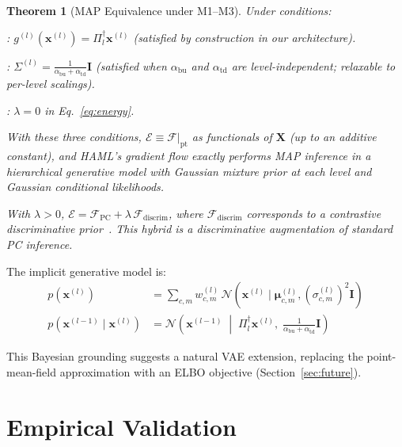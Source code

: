 \documentclass[11pt,a4paper]{article}
\newtheorem{theorem}{Theorem}[section]
\begin{document}
\begin{theorem}[MAP Equivalence under M1--M3]
\label{thm:map}
Under conditions:
\begin{description}[leftmargin=2.5em]
  \item[M1 -- Linear generators]: $g^{(l)}(\mathbf{x}^{(l)}) = \Pi_l^\dagger \mathbf{x}^{(l)}$
        (satisfied by construction in our architecture).
  \item[M2 -- Isotropic covariances]: $\Sigma^{(l)} = \frac{1}{\alpha_{\mathrm{bu}}+\alpha_{\mathrm{td}}}\mathbf{I}$
        (satisfied when $\alpha_{\mathrm{bu}}$ and $\alpha_{\mathrm{td}}$ are level-independent;
        relaxable to per-level scalings).
  \item[M3 -- No repulsion]: $\lambda = 0$ in Eq.~\ref{eq:energy}.
\end{description}
With these three conditions, $\mathcal{E} \equiv \mathcal{F}|_{\mathrm{pt}}$ as functionals
of $\mathbf{X}$ (up to an additive constant), and HAML's gradient flow exactly performs
\emph{MAP inference} in a hierarchical generative model with Gaussian mixture prior at
each level and Gaussian conditional likelihoods.

With $\lambda > 0$, $\mathcal{E} = \mathcal{F}_{\mathrm{PC}} + \lambda\,\mathcal{F}_{\mathrm{discrim}}$,
where $\mathcal{F}_{\mathrm{discrim}}$ corresponds to a contrastive discriminative
prior~\cite{larochelle2008}. This hybrid is a discriminative augmentation of standard PC
inference.
\end{theorem}

The implicit generative model is:
\begin{align}
  p(\mathbf{x}^{(l)}) &=
    \sum_{c,m} w^{(l)}_{c,m}\, \mathcal{N}(\mathbf{x}^{(l)} \mid \boldsymbol{\mu}^{(l)}_{c,m},
    (\sigma^{(l)}_{c,m})^2\mathbf{I}) \\
  p(\mathbf{x}^{(l-1)} \mid \mathbf{x}^{(l)}) &=
    \mathcal{N}\!\left(\mathbf{x}^{(l-1)} \;\middle|\; \Pi_l^\dagger \mathbf{x}^{(l)},\;
    \tfrac{1}{\alpha_{\mathrm{bu}}+\alpha_{\mathrm{td}}}\mathbf{I}\right)
\end{align}

This Bayesian grounding suggests a natural VAE extension, replacing the point-mean-field
approximation with an ELBO objective (Section~\ref{sec:future}).

\section{Empirical Validation}
\end{document}
